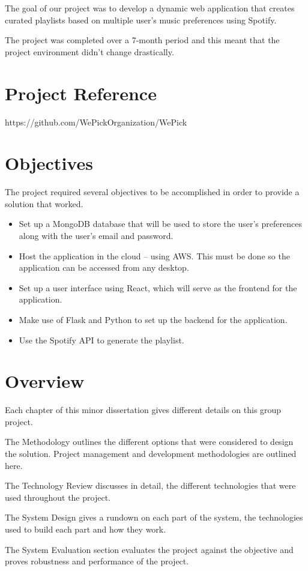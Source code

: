 The goal of our project was to develop a dynamic web application that creates curated playlists based on multiple user's music preferences using Spotify.

The project was completed over a 7-month period and this meant that the project environment didn’t change drastically.

\section{Project Reference}
https://github.com/WePickOrganization/WePick

\section{Objectives}
The project required several objectives to be accomplished in order to provide a solution that worked.
\begin{itemize}
	\item Set up a MongoDB database that will be used to store the user’s preferences along with the user’s email and password.
	\item Host the application in the cloud – using AWS. This must be done so the application can be accessed from any desktop.
	\item Set up a user interface using React, which will serve as the frontend for the application.
	\item Make use of Flask and Python to set up the backend for the application.
	\item Use the Spotify API to generate the playlist.
\end{itemize}

\section{Overview}
Each chapter of this minor dissertation gives different details on this group project.

The Methodology outlines the different options that were considered to design the solution. Project management and development methodologies are outlined here.

The Technology Review discusses in detail, the different technologies that were used throughout the project.

The System Design gives a rundown on each part of the system, the technologies used to build each part and how they work.

The System Evaluation section evaluates the project against the objective and proves robustness and performance of the project.

